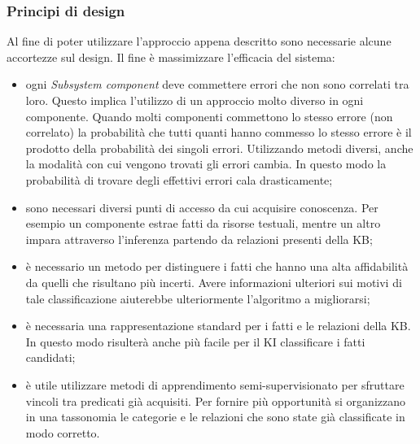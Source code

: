\subsubsection{Principi di design}
Al fine di poter utilizzare l'approccio  appena descritto sono necessarie alcune accortezze sul design. Il fine è massimizzare l'efficacia del sistema:
\begin{itemize}
    \item ogni \textit{Subsystem component} deve commettere errori che non sono correlati tra loro. Questo implica l'utilizzo di un approccio molto diverso in ogni componente. Quando molti componenti commettono lo stesso errore (non correlato) la probabilità che tutti quanti hanno commesso lo stesso errore è il prodotto della probabilità dei singoli errori. Utilizzando metodi diversi, anche la modalità con cui vengono trovati gli errori cambia. In questo modo la probabilità di trovare degli effettivi errori cala drasticamente;
    \item sono necessari diversi punti di accesso da cui acquisire conoscenza. Per esempio un componente estrae fatti da risorse testuali, mentre un altro impara attraverso l'inferenza partendo da relazioni presenti della KB;
    \item è necessario un metodo per distinguere i fatti che hanno una alta affidabilità da quelli che risultano più incerti. Avere informazioni ulteriori sui motivi di tale classificazione aiuterebbe ulteriormente l'algoritmo a migliorarsi;
    \item è necessaria una rappresentazione standard per i fatti e le relazioni della KB. In questo modo risulterà anche più facile per il KI classificare i fatti candidati;
    \item è utile utilizzare metodi di apprendimento semi-supervisionato per sfruttare vincoli tra predicati già acquisiti. Per fornire più opportunità si organizzano in una tassonomia le categorie e le relazioni che sono state già classificate in modo corretto\cite{AlgoritmEM:online}.
\end{itemize}
\newpage